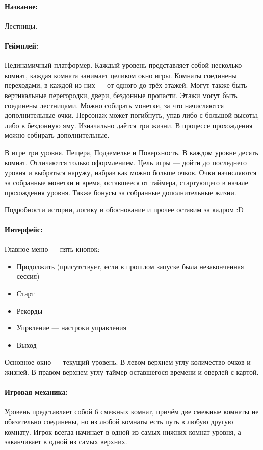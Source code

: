 \documentclass[12pt,a4paper]{article}
\begin{document}
\paragraph{Название:} Лестницы.
\paragraph{Геймплей:} Нединамичный платформер. Каждый уровень представляет собой несколько комнат, каждая комната занимает целиком окно игры. Комнаты соединены переходами, в каждой из них --- от одного до трёх этажей. Могут также быть вертикальные перегородки, двери, бездонные пропасти. Этажи могут быть соединены лестницами. Можно собирать монетки, за что начисляются дополнительные очки. Персонаж может погибнуть, упав либо с большой высоты, либо в бездонную яму. Изначально даётся три жизни. В процессе прохождения можно собирать дополнительные.

В игре три уровня. Пещера, Подземелье и Поверхность. В каждом уровне десять комнат. Отличаются только оформлением. Цель игры --- дойти до последнего уровня и выбраться наружу, набрав как можно больше очков. Очки начисляются за собранные монетки и время, оставшееся от таймера, стартующего в начале прохождения уровня. Также бонусы за собранные дополнительные жизни.

Подробности истории, логику и обоснование и прочее оставим за кадром :D
\paragraph{Интерфейс:}
Главное меню --- пять кнопок:
\begin{itemize}
\item Продолжить (присутствует, если в прошлом запуске была незаконченная сессия)
\item Старт
\item Рекорды
\item Упрвление --- настроки управления
\item Выход
\end{itemize}
Основное окно --- текущий уровень. В левом верхнем углу количество очков и жизней. В правом верхнем углу таймер оставшегося времени и оверлей с картой.
\paragraph{Игровая механика:}
Уровень представляет собой 6 смежных комнат, причём две смежные комнаты не обязательно соединены, но из любой комнаты есть путь в любую другую комнату. Игрок всегда начинает в одной из самых нижних комнат уровня, а заканчивает в одной из самых верхних.
\end{document}
